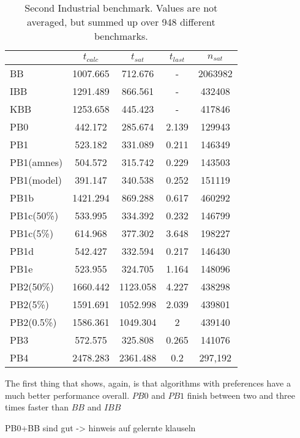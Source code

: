 \begin{wraptable}{R}{8cm}
\begin{tabular}{l| c c c c}
& $t_{calc}$ & $t_{sat}$ & $t_{last}$ & $n_{sat}$ \\
 \hline
BB & 1007.665 & 712.676 & - & 2063982 \\
IBB & 1291.489 & 866.561 & - & 432408 \\
KBB & 1253.658 & 445.423 & - & 417846 \\
PB0 & 442.172 & 285.674 & 2.139 & 129943 \\
PB1 & 523.182 & 331.089 & 0.211 & 146349 \\
PB1(amnes) & 504.572 & 315.742 & 0.229 & 143503 \\
PB1(model) & 391.147 & 340.538 & 0.252 & 151119 \\
PB1b & 1421.294 & 869.288 & 0.617 & 460292 \\
PB1c(50\%) & 533.995 & 334.392 & 0.232 & 146799 \\
PB1c(5\%) & 614.968 & 377.302 & 3.648 & 198227 \\
PB1d & 542.427 & 332.594 & 0.217 & 146430 \\
PB1e & 523.955 & 324.705 & 1.164 & 148096 \\
PB2(50\%) & 1660.442 & 1123.058 & 4.227 & 438298 \\
PB2(5\%) & 1591.691 & 1052.998 & 2.039 & 439801 \\
PB2(0.5\%) & 1586.361 & 1049.304 & 2 & 439140 \\
PB3 & 572.575 & 325.808 & 0.265 & 141076 \\
PB4 & 2478.283 & 2361.488 & 0.2 &297,192 \\
\end{tabular}
\caption{Second Industrial benchmark. Values are not averaged, but summed up over 948 different benchmarks.}
\label{tab:vonThore2pof} %
\end{wraptable}

The first thing that shows, again, is that algorithms with preferences have a much better performance overall. $PB0$ and $PB1$ finish between two and three times faster than $BB$ and $IBB$

PB0+BB sind gut -> hinweis auf gelernte klauseln


